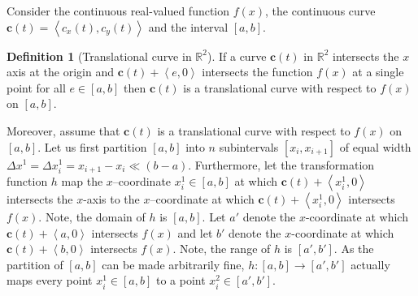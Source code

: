 \documentclass{article}
\theoremstyle{theorem}
\theoremstyle{definition}
\newtheorem*{definition}{Definition}
\begin{document}

\noindent
Consider the continuous real-valued function $f(x)$, the continuous curve $\mathbf{c}(t)=\left <c_x(t),c_y(t) \right >$ and the interval $[a,b]$.

\begin{definition}[Translational curve in $\mathbb{R}^2$]
If a curve $\mathbf{c}(t)$ in $\mathbb{R}^2$ intersects the $x$ axis at the origin and $\mathbf{c}(t) + \left < e,0 \right >$ intersects 
the function $f(x)$ at a single point for all $e\in [a,b]$ then $\mathbf{c}(t)$ is a translational curve 
with respect to $f(x)$ on $[a,b]$. 
\end{definition}

\noindent
Moreover, assume that $\mathbf{c}(t)$ is a translational curve with respect to $f(x)$ on $[a,b]$. Let us first partition $[a,b]$ into $n$ subintervals $[x_{i},x_{i+1}]$ of equal 
width $\Delta x^1 = \Delta x_i^1 = x_{i+1}-x_i\ll (b-a)$. Furthermore, let the transformation function $h$ map the $x$--coordinate $x_i^1\in [a,b]$ at which $\mathbf{c}(t) + \left <x_i^1,0 \right >$ intersects the 
$x$-axis to the $x$--coordinate at which $\mathbf{c}(t) + \left <x_i^1,0 \right >$ intersects $f(x)$. Note, the domain of $h$ is $[a,b]$. Let $a'$ denote the $x$-coordinate 
at which $\mathbf{c}(t) + \left <a,0 \right >$ intersects $f(x)$ and let $b'$ denote the $x$-coordinate 
at which $\mathbf{c}(t) + \left <b,0 \right >$ intersects $f(x)$.  Note, the range 
of $h$ is $[a',b']$. As the partition of $[a,b]$ can be made arbitrarily fine, $h:[a,b]\rightarrow [a',b']$ actually maps every point $x_i^1\in [a,b]$ to a point $x_i^2\in [a',b']$. \\
\end{document}
